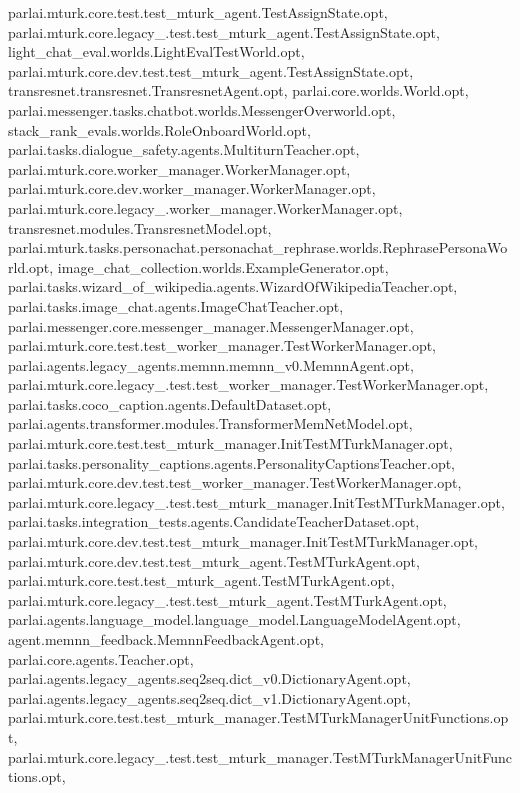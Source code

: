 parlai.\+mturk.\+core.\+test.\+test\+\_\+mturk\+\_\+agent.\+Test\+Assign\+State.\+opt, parlai.\+mturk.\+core.\+legacy\+\_.\+test.\+test\+\_\+mturk\+\_\+agent.\+Test\+Assign\+State.\+opt, light\+\_\+chat\+\_\+eval.\+worlds.\+Light\+Eval\+Test\+World.\+opt, parlai.\+mturk.\+core.\+dev.\+test.\+test\+\_\+mturk\+\_\+agent.\+Test\+Assign\+State.\+opt, transresnet.\+transresnet.\+Transresnet\+Agent.\+opt, parlai.\+core.\+worlds.\+World.\+opt, parlai.\+messenger.\+tasks.\+chatbot.\+worlds.\+Messenger\+Overworld.\+opt, stack\+\_\+rank\+\_\+evals.\+worlds.\+Role\+Onboard\+World.\+opt, parlai.\+tasks.\+dialogue\+\_\+safety.\+agents.\+Multiturn\+Teacher.\+opt, parlai.\+mturk.\+core.\+worker\+\_\+manager.\+Worker\+Manager.\+opt, parlai.\+mturk.\+core.\+dev.\+worker\+\_\+manager.\+Worker\+Manager.\+opt, parlai.\+mturk.\+core.\+legacy\+\_.\+worker\+\_\+manager.\+Worker\+Manager.\+opt, transresnet.\+modules.\+Transresnet\+Model.\+opt, parlai.\+mturk.\+tasks.\+personachat.\+personachat\+\_\+rephrase.\+worlds.\+Rephrase\+Persona\+World.\+opt, image\+\_\+chat\+\_\+collection.\+worlds.\+Example\+Generator.\+opt, parlai.\+tasks.\+wizard\+\_\+of\+\_\+wikipedia.\+agents.\+Wizard\+Of\+Wikipedia\+Teacher.\+opt, parlai.\+tasks.\+image\+\_\+chat.\+agents.\+Image\+Chat\+Teacher.\+opt, parlai.\+messenger.\+core.\+messenger\+\_\+manager.\+Messenger\+Manager.\+opt, parlai.\+mturk.\+core.\+test.\+test\+\_\+worker\+\_\+manager.\+Test\+Worker\+Manager.\+opt, parlai.\+agents.\+legacy\+\_\+agents.\+memnn.\+memnn\+\_\+v0.\+Memnn\+Agent.\+opt, parlai.\+mturk.\+core.\+legacy\+\_.\+test.\+test\+\_\+worker\+\_\+manager.\+Test\+Worker\+Manager.\+opt, parlai.\+tasks.\+coco\+\_\+caption.\+agents.\+Default\+Dataset.\+opt, parlai.\+agents.\+transformer.\+modules.\+Transformer\+Mem\+Net\+Model.\+opt, parlai.\+mturk.\+core.\+test.\+test\+\_\+mturk\+\_\+manager.\+Init\+Test\+M\+Turk\+Manager.\+opt, parlai.\+tasks.\+personality\+\_\+captions.\+agents.\+Personality\+Captions\+Teacher.\+opt, parlai.\+mturk.\+core.\+dev.\+test.\+test\+\_\+worker\+\_\+manager.\+Test\+Worker\+Manager.\+opt, parlai.\+mturk.\+core.\+legacy\+\_.\+test.\+test\+\_\+mturk\+\_\+manager.\+Init\+Test\+M\+Turk\+Manager.\+opt, parlai.\+tasks.\+integration\+\_\+tests.\+agents.\+Candidate\+Teacher\+Dataset.\+opt, parlai.\+mturk.\+core.\+dev.\+test.\+test\+\_\+mturk\+\_\+manager.\+Init\+Test\+M\+Turk\+Manager.\+opt, parlai.\+mturk.\+core.\+dev.\+test.\+test\+\_\+mturk\+\_\+agent.\+Test\+M\+Turk\+Agent.\+opt, parlai.\+mturk.\+core.\+test.\+test\+\_\+mturk\+\_\+agent.\+Test\+M\+Turk\+Agent.\+opt, parlai.\+mturk.\+core.\+legacy\+\_.\+test.\+test\+\_\+mturk\+\_\+agent.\+Test\+M\+Turk\+Agent.\+opt, parlai.\+agents.\+language\+\_\+model.\+language\+\_\+model.\+Language\+Model\+Agent.\+opt, agent.\+memnn\+\_\+feedback.\+Memnn\+Feedback\+Agent.\+opt, parlai.\+core.\+agents.\+Teacher.\+opt, parlai.\+agents.\+legacy\+\_\+agents.\+seq2seq.\+dict\+\_\+v0.\+Dictionary\+Agent.\+opt, parlai.\+agents.\+legacy\+\_\+agents.\+seq2seq.\+dict\+\_\+v1.\+Dictionary\+Agent.\+opt, parlai.\+mturk.\+core.\+test.\+test\+\_\+mturk\+\_\+manager.\+Test\+M\+Turk\+Manager\+Unit\+Functions.\+opt, parlai.\+mturk.\+core.\+legacy\+\_.\+test.\+test\+\_\+mturk\+\_\+manager.\+Test\+M\+Turk\+Manager\+Unit\+Functions.\+opt, 